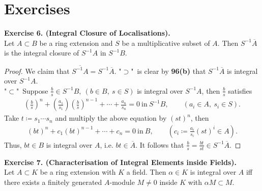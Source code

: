 \documentclass[12pt,a4paper,footinclude=true,headinclude=true]{scrbook} %
\newenvironment{exe}[2][Exercise]
    { \begin{mdframed}[backgroundcolor=gray!20] \textbf{#1 #2.}\\ }
    {  \end{mdframed}}
\begin{document}
\section{Exercises}
\begin{exe}{6. (Integral Closure of Localisations)}
    Let $A\subset B$ be a ring extension and $S$ be a multiplicative subset of $A$. Then $S^{-1}\overline{A}$ is the integral closure of $S^{-1}A$ in $S^{-1}B$.
\end{exe}
\begin{proof}
    We claim that $\overline{S^{-1}A}=S^{-1}\overline{A}$. "$\supset$"\ is clear by \textbf{96(b)} that $S^{-1}\overline{A}$ is integral over $S^{-1}A$.\\
    "$\subset$"\ Suppose $\frac{b}{s}\in S^{-1}B,\ (b\in B,\ s\in S)$ is integral over $S^{-1}A$, then $\frac{b}{s}$ satisfies
    \begin{align*}
        (\tfrac{b}{s})^n+(\tfrac{a_1}{s_1})(\tfrac{b}{s})^{n-1}+\cdots+\tfrac{a_n}{s_n}=0\ \text{in}\ S^{-1}B,\qquad (a_i\in A,\ s_i\in S).
    \end{align*}
    Take $t\coloneqq s_1\cdots s_n$ and multiply the above equation by $(st)^n$, then
    \begin{align*}
        (bt)^n+c_1(bt)^{n-1}+\cdots+c_n=0\ \text{in}\ B,\qquad (c_i\coloneqq\tfrac{a_i}{s_i}(st)^i\in A).
    \end{align*}
    Thus, $bt\in B$ is integral over $A$, i.e. $bt\in\overline{A}$. It follows that $\frac{b}{s}=\frac{bt}{st}\in S^{-1}\overline{A}$.
\end{proof}

\begin{exe}{7. (Characterisation of Integral Elements inside Fields)}
    Let $A\subset K$ be a ring extension with $K$ a field. Then $\alpha\in K$ is integral over $A$ iff there exists a finitely generated $A$-module $M\neq0$ inside $K$ with $\alpha M\subset M$.
\end{exe}
\end{document}
